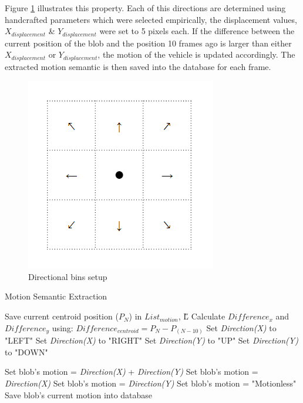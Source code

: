 Figure \ref{fig:cardinalbins} illustrates this property. Each of this directions are determined using handcrafted parameters which were selected empirically, the displacement values, $X_{displacement}$ \& $Y_{displacement}$ were set to 5 pixels each. If the difference between the current position of the blob and the position 10 frames ago is larger than either $X_{displacement}$ or $Y_{displacement}$, the motion of the vehicle is updated accordingly. The extracted motion semantic is then saved into the database for each frame. 

\begin{figure}[H]\centering
\includegraphics[width=.5\textwidth]{image/new/motion.PNG}
\caption{Directional bins setup}
\label{fig:cardinalbins}
\end{figure}


 \begin{algorithm}[H]
	\caption{Motion Semantic Extraction}
	\label{algo:motion}
	\begin{algorithmic}[1]
		\STATE Save current centroid position ($P_N$) in $List_{motion}$, \H{L} 
		\STATE Calculate $Difference_x$ and $Difference_y$ using:
		\STATE $Difference_{centroid} = P_N -P_{(N-10)}$ 
		\STATE Set \textit{Direction(X)} to "LEFT"
		\ELSE  
		\STATE Set \textit{Direction(X)} to "RIGHT"
		\ENDIF
		\ENDIF
		\STATE Set \textit{Direction(Y)} to "UP"
		\ELSE 
		\STATE Set \textit{Direction(Y)} to "DOWN"
		\ENDIF
		\ENDIF

		\STATE Set blob's motion = \textit{Direction(X)} + \textit{Direction(Y)}
		\ELSE 
		\STATE Set blob's motion = \textit{Direction(X) }
		\STATE Set blob's motion = \textit{Direction(Y)}
		\ELSE 
		\STATE Set blob's motion = "Motionless"
		\ENDIF
		\ENDIF
		\ENDIF
		\STATE Save blob's current motion into database
		\ENDFOR
	\end{algorithmic}
\end{algorithm}




